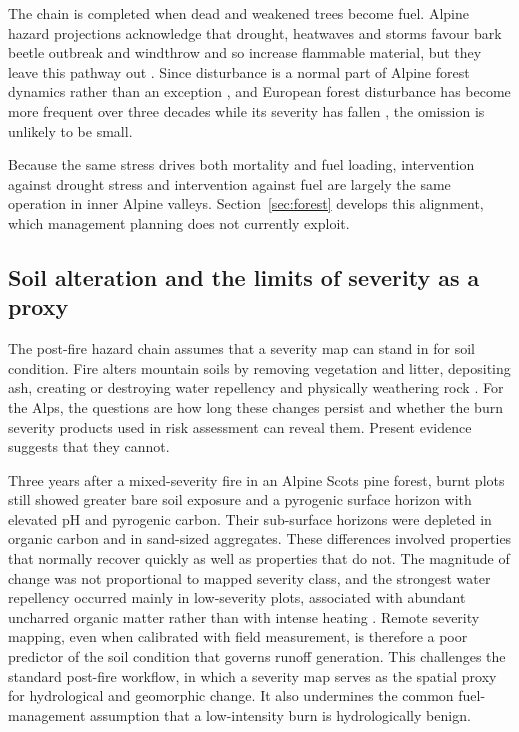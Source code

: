 \documentclass[11pt,a4paper]{article}
\begin{document}
The chain is completed when dead and weakened trees become fuel. Alpine hazard projections acknowledge that drought, heatwaves and storms favour bark beetle outbreak and windthrow and so increase flammable material, but they leave this pathway out \citep{gerberding_mapping_2025}. Since disturbance is a normal part of Alpine forest dynamics rather than an exception \citep{bebi_changes_2017}, and European forest disturbance has become more frequent over three decades while its severity has fallen \citep{senf_mapping_2021}, the omission is unlikely to be small.

Because the same stress drives both mortality and fuel loading, intervention against drought stress and intervention against fuel are largely the same operation in inner Alpine valleys. Section~\ref{sec:forest} develops this alignment, which management planning does not currently exploit.

\subsection{Soil alteration and the limits of severity as a proxy}

The post-fire hazard chain assumes that a severity map can stand in for soil condition. Fire alters mountain soils by removing vegetation and litter, depositing ash, creating or destroying water repellency and physically weathering rock \citep{santi_wildfire_2022}. For the Alps, the questions are how long these changes persist and whether the burn severity products used in risk assessment can reveal them. Present evidence suggests that they cannot.

Three years after a mixed-severity fire in an Alpine Scots pine forest, burnt plots still showed greater bare soil exposure and a pyrogenic surface horizon with elevated pH and pyrogenic carbon. Their sub-surface horizons were depleted in organic carbon and in sand-sized aggregates. These differences involved properties that normally recover quickly as well as properties that do not. The magnitude of change was not proportional to mapped severity class, and the strongest water repellency occurred mainly in low-severity plots, associated with abundant uncharred organic matter rather than with intense heating \citep{negri_wildfire_2026}. Remote severity mapping, even when calibrated with field measurement, is therefore a poor predictor of the soil condition that governs runoff generation. This challenges the standard post-fire workflow, in which a severity map serves as the spatial proxy for hydrological and geomorphic change. It also undermines the common fuel-management assumption that a low-intensity burn is hydrologically benign.
\end{document}
